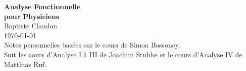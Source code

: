 \documentclass[a4paper,10pt,preprint,aps,tightenlines,showpacs,superscriptaddress]{revtex4}	%
\theoremstyle{definition}
\begin{document}
\begin{titlepage}
   \begin{center}
      \Huge\textbf{Analyse Fonctionnelle\\pour Physiciens}\\
      \text{ }\newline
      \large{Baptiste Claudon}\\
      \today\\
      \vspace{5cm}Notes personnelles basées sur le cours de Simon Bossoney.\\Suit les cours d'Analyse I à III de Joachim Stubbe et le cours d'Analyse IV de Matthias Ruf.
   \end{center}
\end{titlepage}

\tableofcontents\newpage
\newpage

\newpage

\newpage

\newpage

\end{document}
